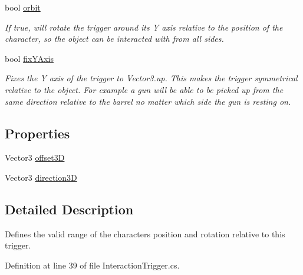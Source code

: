 \begin{DoxyCompactItemize}
bool \mbox{\hyperlink{class_root_motion_1_1_final_i_k_1_1_interaction_trigger_1_1_character_position_a2b583754e4e42db3b6d926b029d29233}{orbit}}
\begin{DoxyCompactList}\small\item\em If true, will rotate the trigger around it\textquotesingle{}s Y axis relative to the position of the character, so the object can be interacted with from all sides. \end{DoxyCompactList}\item 
bool \mbox{\hyperlink{class_root_motion_1_1_final_i_k_1_1_interaction_trigger_1_1_character_position_a8f40dccf2a3cfa6d3d34e9af12c945a1}{fix\+Y\+Axis}}
\begin{DoxyCompactList}\small\item\em Fixes the Y axis of the trigger to Vector3.\+up. This makes the trigger symmetrical relative to the object. For example a gun will be able to be picked up from the same direction relative to the barrel no matter which side the gun is resting on. \end{DoxyCompactList}\end{DoxyCompactItemize}
\subsection*{Properties}
\begin{DoxyCompactItemize}
\item 
Vector3 \mbox{\hyperlink{class_root_motion_1_1_final_i_k_1_1_interaction_trigger_1_1_character_position_a0880d042aa7ad0d2b40a114393c65103}{offset3D}}
\item 
Vector3 \mbox{\hyperlink{class_root_motion_1_1_final_i_k_1_1_interaction_trigger_1_1_character_position_a24252c1d4515721e37195a0c740ff492}{direction3D}}
\end{DoxyCompactItemize}


\subsection{Detailed Description}
Defines the valid range of the character\textquotesingle{}s position and rotation relative to this trigger. 



Definition at line 39 of file Interaction\+Trigger.\+cs.



